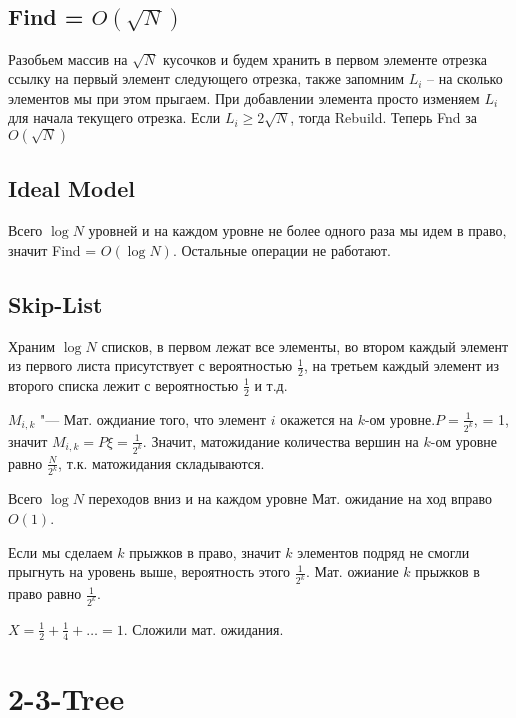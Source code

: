 \subsection{Find = \texorpdfstring{$O(\sqrt{N})$}{O(Sqrt(N))}}

Разобьем массив на $\sqrt{N}$ кусочков и будем хранить в первом элементе отрезка ссылку на первый элемент следующего отрезка, также запомним $L_{i}$ -- на сколько элементов мы при этом прыгаем. При добавлении элемента просто изменяем $L_{i}$ для начала текущего отрезка. Если $L_{i} \geqslant 2 \sqrt{N}$, тогда Rebuild. Теперь Fnd за $O(\sqrt{N})$\\



\subsection{Ideal Model}


Всего $\log{N}$ уровней и на каждом уровне не более одного раза мы идем в право, значит Find = $O(\log{N})$. Остальные операции не работают.


\subsection{Skip-List}

Храним $\log{N}$ списков, в первом лежат все элементы, во втором каждый элемент из первого листа присутствует с вероятностью $\frac{1}{2}$, на третьем каждый элемент из второго списка лежит с вероятностью $\frac{1}{2}$ и т.д.

$M_{i, k}$ "--- Мат. ождиание того, что элемент $i$ окажется на $k$-ом уровне.$ P = \frac{1}{2^{k}}$, \xi = 1, значит $M_{i,k} = P \xi = \frac{1}{2^{k}}$.
Значит, матожидание количества вершин на $k$-ом уровне равно $\frac{N}{2^{k}}$, т.к. матожидания складываются.

Всего $\log{N}$ переходов вниз и на каждом уровне Мат. ожидание на ход вправо $O(1)$.

Если мы сделаем $k$ прыжков в право, значит $k$ элементов подряд не смогли прыгнуть на уровень выше, вероятность этого $\frac{1}{2^{k}}$. Мат. ожиание $k$ прыжков в право равно $\frac{1}{2^{k}}$.

$X = \frac{1}{2} + \frac{1}{4} + \dots = 1$. Сложили мат. ожидания.

\section{2-3-Tree}

